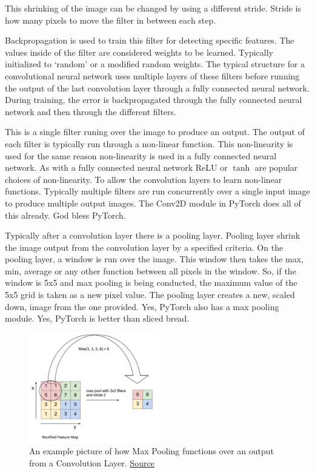 This shrinking of the image can be changed by using a different stride.
Stride is how many pixels to move the filter in between each step.

Backpropagation is used to train this filter for detecting specific features.
The values inside of the filter are considered weights to be learned.
Typically initialized to `random' or a modified random weights.
The typical structure for a convolutional neural network uses multiple layers of these filters before running the output of the last convolution layer through a fully connected neural network.
During training, the error is backpropagated through the fully connected neural network and then through the different filters.

This is a single filter runing over the image to produce an output.
The output of each filter is typically run through a non-linear function.
This non-linearity is used for the same reason non-linearity is used in a fully connected neural network.
As with a fully connected neural network ReLU or $\tanh$ are popular choices of non-linearity.
To allow the convolution layers to learn non-linear functions.
Typically multiple filters are run concurrently over a single input image to produce multiple output images.
The Conv2D module in PyTorch does all of this already.
God bless PyTorch.

Typically after a convolution layer there is a pooling layer.
Pooling layer shrink the image output from the convolution layer by a specified criteria.
On the pooling layer, a window is run over the image.
This window then takes the max, min, average or any other function between all pixels in the window.
So, if the window is 5x5 and max pooling is being conducted, the maximum value of the 5x5 grid is taken as a new pixel value.
The pooling layer creates a new, scaled down, image from the one provided.
Yes, PyTorch also has a max pooling module.
Yes, PyTorch is better than sliced bread.

\begin{figure}[ht]
  \centering
      \includegraphics[width=0.5\textwidth]{lectures/03-b/images/MaxPooling.png}
          \caption{
            An example picture of how Max Pooling functions over an output from a Convolution Layer.
            \href{https://ulkarn.me/2016/08/11/intuitive-explanation-convnets/}{Source}
          }
\end{figure}

